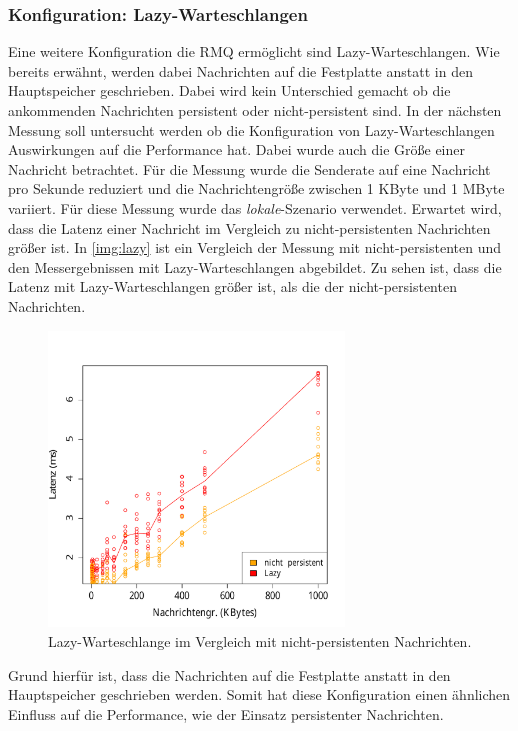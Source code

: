 \subsubsection{Konfiguration: Lazy-Warteschlangen}
\label{sec:rmqLazy}
Eine weitere Konfiguration die RMQ ermöglicht sind Lazy-Warteschlangen. Wie bereits erwähnt, werden dabei Nachrichten auf die Festplatte anstatt in den Hauptspeicher geschrieben. Dabei wird kein Unterschied gemacht ob die ankommenden Nachrichten persistent oder nicht-persistent sind. In der nächsten Messung soll untersucht werden ob die Konfiguration von Lazy-Warteschlangen Auswirkungen auf die Performance hat. Dabei wurde auch die Größe einer Nachricht betrachtet. Für die Messung wurde die Senderate auf eine Nachricht pro Sekunde reduziert und die Nachrichtengröße zwischen 1 KByte und 1 MByte variiert. Für diese Messung wurde das \textit{lokale}-Szenario verwendet. Erwartet wird, dass die Latenz einer Nachricht im Vergleich zu nicht-persistenten Nachrichten größer ist. 
In \autoref{img:lazy} ist ein Vergleich der Messung mit nicht-persistenten und den Messergebnissen mit Lazy-Warteschlangen abgebildet. Zu sehen ist, dass die Latenz mit Lazy-Warteschlangen größer ist, als die der nicht-persistenten Nachrichten.
\begin{figure}
\center
  \includegraphics[width=0.7\textwidth]{images/measurement/lazy-queues.pdf}
  \caption{Lazy-Warteschlange im Vergleich mit nicht-persistenten Nachrichten.}
  \label{img:lazy}
\end{figure}
Grund hierfür ist, dass die Nachrichten auf die Festplatte anstatt in den Hauptspeicher geschrieben werden. Somit hat diese Konfiguration einen ähnlichen Einfluss auf die Performance, wie der Einsatz persistenter Nachrichten.



